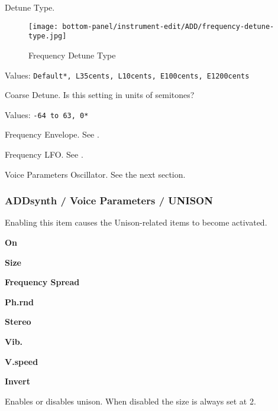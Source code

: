    Detune Type.

\begin{figure}[H]
   \centering
   \texttt{[image: bottom-panel/instrument-edit/ADD/frequency-detune-type.jpg]}
   \caption{Frequency Detune Type}
   \label{fig:frequency_detune_tYpe}
\end{figure}

   Values: \texttt{Default*, L35cents, L10cents, E100cents, E1200cents}

   Coarse Detune.
   Is this setting in units of semitones?

   Values: \texttt{-64 to 63, 0*}

   Frequency Envelope.
   See .

   Frequency LFO.
   See .

   Voice Parameters Oscillator.
   See the next section.

\subsubsection{ADDsynth / Voice Parameters / UNISON}
\label{subsubsec:addsynth_voice_parameters_unison}
   Enabling this item causes the Unison-related items to become
   activated.

   \begin{enumber}
      \item \textbf{On}
      \item \textbf{Size}
      \item \textbf{Frequency Spread}
      \item \textbf{Ph.rnd}
      \item \textbf{Stereo}
      \item \textbf{Vib.}
      \item \textbf{V.speed}
      \item \textbf{Invert}
   \end{enumber}

   \setcounter{ItemCounter}{0}      %

   Enables or disables unison. When disabled the size is always set at 2.

